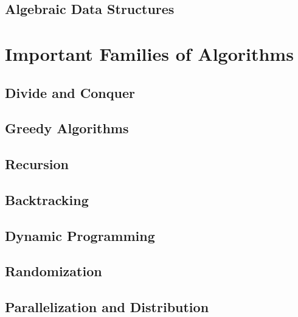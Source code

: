 \documentclass{book}
\begin{document}
\chapter{Algebraic Data Structures}\label{sec:ad:theories}


\part{Important Families of Algorithms}\label{sec:ad:algo}

\chapter{Divide and Conquer}
 
\chapter{Greedy Algorithms}

\chapter{Recursion}
%
\chapter{Backtracking}

\chapter{Dynamic Programming}

\chapter{Randomization}

\chapter{Parallelization and Distribution}
\end{document}
